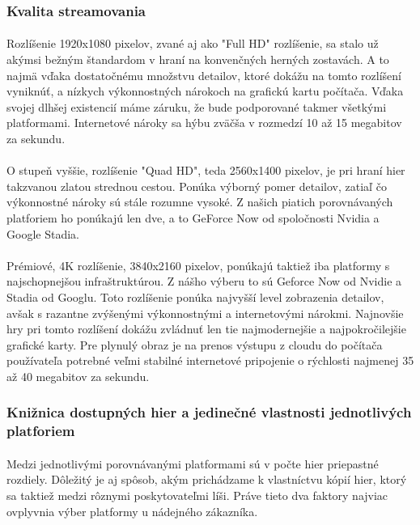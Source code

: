 \documentclass[10pt,twoside,slovak,a4paper]{article}
\begin{document}
\subsubsection{Kvalita streamovania}

\paragraph{} Rozlíšenie 1920x1080 pixelov, zvané aj ako "Full HD" rozlíšenie, sa stalo už akýmsi bežným štandardom v hraní na konvenčných herných zostavách. A to najmä vďaka dostatočnému množstvu detailov, ktoré dokážu na tomto rozlíšení vyniknúť, a nízkych výkonnostných nárokoch na grafickú kartu počítača. Vďaka svojej dlhšej existencií máme záruku, že bude podporované takmer všetkými platformami. Internetové nároky sa hýbu zväčša v rozmedzí 10 až 15 megabitov za sekundu.

\paragraph{} O stupeň vyššie, rozlíšenie "Quad HD", teda 2560x1400 pixelov, je pri hraní hier takzvanou zlatou strednou cestou. Ponúka výborný pomer detailov, zatiaľ čo výkonnostné nároky sú stále rozumne vysoké. Z našich piatich porovnávaných platforiem ho ponúkajú len dve, a to GeForce Now od spoločnosti Nvidia a Google Stadia.

\paragraph{} Prémiové, 4K rozlíšenie, 3840x2160 pixelov, ponúkajú taktiež iba platformy s najschopnejšou infraštruktúrou. Z nášho výberu to sú Geforce Now od Nvidie a Stadia od Googlu. Toto rozlíšenie ponúka najvyšší level zobrazenia detailov, avšak s razantne zvýšenými výkonnostnými a internetovými nárokmi. Najnovšie hry pri tomto rozlíšení dokážu zvládnuť len tie najmodernejšie a najpokročilejšie grafické karty. Pre plynulý obraz je na prenos výstupu z cloudu do počítača používateľa potrebné veľmi stabilné internetové pripojenie o rýchlosti najmenej 35 až 40 megabitov za sekundu.

\subsubsection{Knižnica dostupných hier a jedinečné vlastnosti jednotlivých platforiem}

\paragraph{} Medzi jednotlivými porovnávanými platformami sú v počte hier priepastné rozdiely. Dôležitý je aj spôsob, akým prichádzame k vlastníctvu kópií hier, ktorý sa taktiež medzi rôznymi poskytovateľmi líši. Práve tieto dva faktory najviac ovplyvnia výber platformy u nádejného zákazníka.
\end{document}

